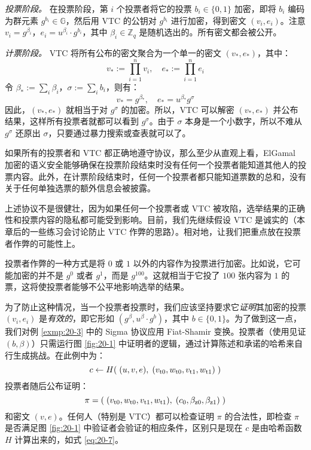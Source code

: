 \emph{投票阶段。}
在投票阶段，第 $i$ 个投票者将它的投票 $b_i\in\{0,1\}$ 加密，即将 $b_i$ 编码为群元素 $g^{b_i}\in\mathbb{G}$，然后用 VTC 的公钥对 $g^{b_i}$ 进行加密，得到密文 $(v_i,e_i)$。注意 $v_i=g^{\beta_i}$，$e_i=u^{\beta_i}\cdot g^{b_i}$，其中 $\beta_i\in\mathbb{Z}_q$ 是随机选出的。所有密文都会被公开。

\emph{计票阶段。}
VTC 将所有公布的密文聚合为一个单一的密文 $(v_*,e_*)$，其中：    
\[
v_*:=\prod_{i=1}^nv_i,
\quad
e_*:=\prod_{i=1}^ne_i
\]
令 $\beta_*:=\sum_i\beta_i$，$\sigma:=\sum_ib_i$，则有：
\[
v_*=g^{\beta_*},
\quad
e_*=u^{\beta_*}g^\sigma
\]
因此，$(v_*,e_*)$ 就相当于对 $g^\sigma$ 的加密。所以，VTC 可以解密 $(v_*,e_*)$ 并公布结果，这样所有投票者就都可以看到 $g^\sigma$。由于 $\sigma$ 本身是一个小数字，所以不难从 $g^\sigma$ 还原出 $\sigma$，只要通过暴力搜索或查表就可以了。

如果所有的投票者和 VTC 都正确地遵守协议，那么至少从直观上看，ElGamal 加密的语义安全能够确保在投票阶段结束时没有任何一个投票者能知道其他人的投票内容。此外，在计票阶段结束时，任何一个投票者都只能知道票数的总和，没有关于任何单独选票的额外信息会被披露。

上述协议不是很健壮，因为如果任何一个投票者或 VTC 被攻陷，选举结果的正确性和投票内容的隐私都可能受到影响。目前，我们先继续假设 VTC 是诚实的（本章后的一些练习会讨论防止 VTC 作弊的思路）。相对地，让我们把重点放在投票者作弊的可能性上。

投票者作弊的一种方式是将 $0$ 或 $1$ 以外的内容作为投票进行加密。比如说，它可能加密的并不是 $g^0$ 或者 $g^1$，而是 $g^{100}$。这就相当于它投了 $100$ 张内容为 $1$ 的票，这将使投票者能够不公平地影响选举的结果。

为了防止这种情况，当一个投票者投票时，我们应该坚持要求它\emph{证明}其加密的投票 $(v_i,e_i)$ 是\emph{有效的}，即它形如 $(g^\beta,u^\beta\cdot g^b)$，其中 $b\in\{0,1\}$。为了做到这一点，我们对例 \ref{exmp:20-3} 中的 Sigma 协议应用 Fiat-Shamir 变换。投票者（使用见证 $(b,\beta)$）只需运行图 \ref{fig:20-1} 中证明者的逻辑，通过计算陈述和承诺的哈希来自行生成挑战。在此例中为：
\begin{equation}\label{eq:20-7}
c\leftarrow H(\;(u,v,e),\;(v_{\rm t0},w_{\rm t0},v_{\rm t1},w_{\rm t1})\;)
\end{equation}
投票者随后公布证明：
\begin{equation}\label{eq:20-8}
\pi=(\;(v_{\rm t0},w_{\rm t0},v_{\rm t1},w_{\rm t1}),\;(c_0,\beta_{\rm z0},\beta_{\rm z1})\;)
\end{equation}
和密文 $(v,e)$。任何人（特别是 VTC）都可以检查证明 $\pi$ 的合法性，即检查 $\pi$ 是否满足图 \ref{fig:20-1} 中验证者会验证的相应条件，区别只是现在 $c$ 是由哈希函数 $H$ 计算出来的，如式 \ref{eq:20-7}。

